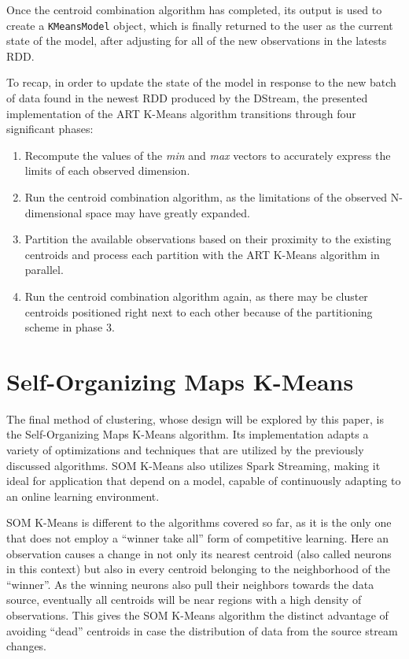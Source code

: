 \documentclass{l4proj}
\begin{document}
Once the centroid combination algorithm has completed, its output is used to create a \texttt{KMeansModel} object, which is finally returned to the user as the current state of the model, after adjusting for all of the new observations in the latests RDD.

To recap, in order to update the state of the model in response to the new batch of data found in the newest RDD produced by the DStream, the presented implementation of the ART K-Means algorithm transitions through four significant phases:

\begin{enumerate}
\item Recompute the values of the \textit{min} and \textit{max} vectors to accurately express the limits of each observed dimension.
\item Run the centroid combination algorithm, as the limitations of the observed N-dimensional space may have greatly expanded.
\item Partition the available observations based on their proximity to the existing centroids and process each partition with the ART K-Means algorithm in parallel.
\item Run the centroid combination algorithm again, as there may be cluster centroids positioned right next to each other because of the partitioning scheme in phase 3.
\end{enumerate}


\chapter{Self-Organizing Maps K-Means}
\label{som}

The final method of clustering, whose design will be explored by this paper, is the Self-Organizing Maps K-Means algorithm. Its implementation adapts a variety of optimizations and techniques that are utilized by the previously discussed algorithms. SOM K-Means also utilizes Spark Streaming, making it ideal for application that depend on a model, capable of continuously adapting to an online learning environment.

SOM K-Means is different to the algorithms covered so far, as it is the only one that does not employ a ``winner take all'' form of competitive learning. Here an observation causes a change in not only its nearest centroid (also called neurons in this context) but also in every centroid belonging to the neighborhood of the ``winner''. As the winning neurons also pull their neighbors towards the data source, eventually all centroids will be near regions with a high density of observations. This gives the SOM K-Means algorithm the distinct advantage of avoiding ``dead'' centroids in case the distribution of data from the source stream changes.
\end{document}

